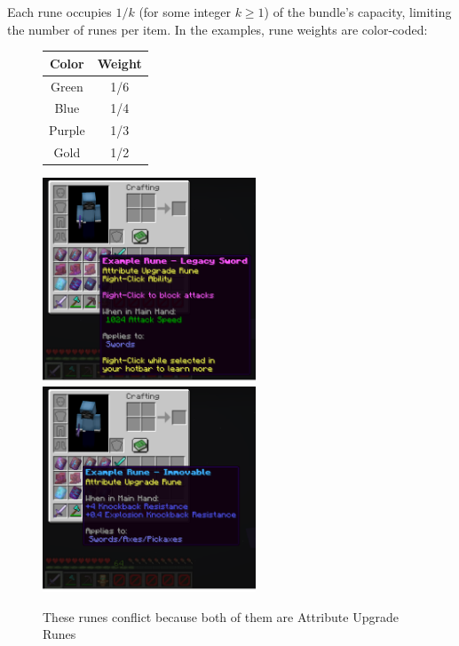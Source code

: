 \documentclass[11pt]{article}
\begin{document}
Each rune occupies $1/k$ (for some integer $k \geq 1$) of the bundle's capacity, limiting the number of runes per item. In the examples, rune weights are color-coded:

\begin{figure}[htbp]
  \centering
  \begin{tabular}{|c|c|}
    \hline
    \textbf{Color} & \textbf{Weight} \\ %
    \hline
    \colorbox[HTML]{00AA00}{Green} & 1/6 \\ %
    \hline
    \colorbox[HTML]{3FAFFF}{Blue} & 1/4 \\
    \hline
    \colorbox[HTML]{FF55FF}{Purple} & 1/3 \\
    \hline
    \colorbox[HTML]{FFAA00}{Gold} & 1/2 \\
    \hline
  \end{tabular}
\end{figure}

\begin{figure}[htbp]
  \centering
  \includegraphics[width=2.5in]{Screenshot from 2025-04-04 23-18-59.png}
  \includegraphics[width=2.5in]{Screenshot from 2025-04-04 23-19-04.png}
  \caption{These runes conflict because both of them are Attribute Upgrade Runes}
\end{figure}
\end{document}
